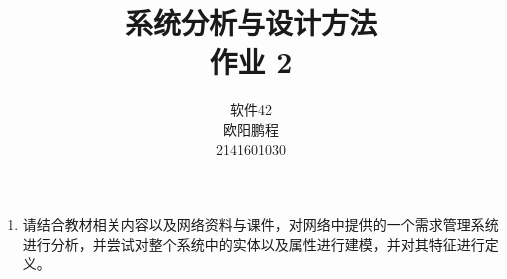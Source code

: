 \documentclass[UTF8]{ctexart}
\title{系统分析与设计方法 \\ 作业 2}
\author{软件42 \\ 欧阳鹏程 \\ 2141601030}
\begin{document}
\maketitle

\begin{enumerate}
	\item
	请结合教材相关内容以及网络资料与课件，对网络中提供的一个需求管理系统进行分析，并尝试对整个系统中的实体以及属性进行建模，并对其特征进行定义。
\end{enumerate}
\end{document}
